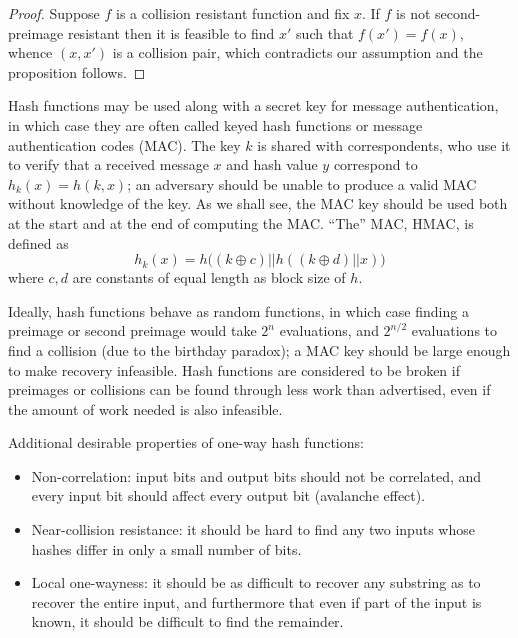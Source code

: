 \documentclass[a4paper,12pt]{article}
\begin{document}
\begin{proof}
Suppose $f$ is a collision resistant function and fix $x$. If $f$ is not second-preimage resistant then it is feasible to find $x'$ such that $f(x')=f(x)$, whence $(x,x')$ is a collision pair, which contradicts our assumption and the proposition follows.
\end{proof}

Hash functions may be used along with a secret key for message authentication, in which case they are often called keyed hash functions or message authentication codes (MAC). The key $k$ is shared with correspondents, who use it to verify that a received message $x$ and hash value $y$ correspond to $h_k(x) = h(k,x)$; an adversary should be unable to produce a valid MAC without knowledge of the key. \cite[p. 323]{menezes} As we shall see, the MAC key should be used both at the start and at the end of computing the MAC. ``The'' MAC, HMAC, is defined as
$$h_k(x) = h\Big( (k \oplus c)||h((k \oplus d)||x) \Big)$$
where $c,d$ are constants of equal length as block size of $h$. \cite{hmac}

Ideally, hash functions behave as random functions, in which case finding a preimage or second preimage would take $2^n$ evaluations, and $2^{n/2}$ evaluations to find a collision (due to the birthday paradox); a MAC key should be large enough to make recovery infeasible. Hash functions are considered to be broken if preimages or collisions can be found through less work than advertised, even if the amount of work needed is also infeasible. \cite[p. 335]{menezes}

Additional desirable properties of one-way hash functions: \cite[p. 331]{menezes}

\begin{itemize}
\item Non-correlation: input bits and output bits should not be correlated, and every input bit should affect every output bit (avalanche effect).

\item Near-collision resistance: it should be hard to find any two inputs whose hashes differ in only a small number of bits.

\item Local one-wayness: it should be as difficult to recover any substring as to recover the entire input, and furthermore that even if part of the input is known, it should be difficult to find the remainder.
\end{itemize}
\end{document}

